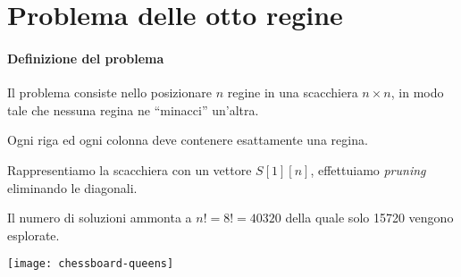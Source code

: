 \NoCaptionOfAlgo
\begin{algorithm}[H]
\caption[Stampa tutte le permutazioni di un insieme \(A\)]{}


\end{algorithm}

\section{Problema delle otto regine}

\begin{minipage}[c]{.675\textwidth}
\paragraph{Definizione del problema}
Il problema consiste nello posizionare \(n\) regine in una scacchiera \(n \times n\), in modo tale che nessuna regina ne \enquote{minacci} un'altra.

\begin{idea}
Ogni riga ed ogni colonna deve contenere esattamente una regina.
\end{idea}

Rappresentiamo la scacchiera con un vettore \(S[1][n]\), effettuiamo \emph{pruning} eliminando le diagonali.

Il numero di soluzioni ammonta a \(n! = 8! = \num{40320}\) della quale solo \num{15720} vengono esplorate.
\end{minipage}\hfill
\begin{minipage}[c]{.3\textwidth}
	\centering
		\texttt{[image: chessboard-queens]}
\end{minipage}

